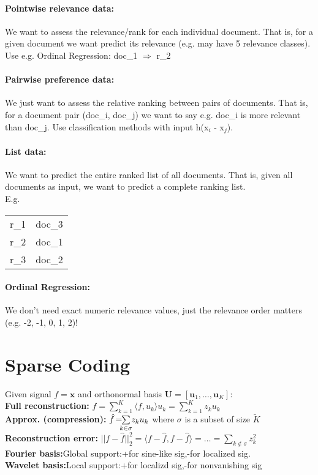 \documentclass[a4paper,11pt]{article}
\newcommand{\msection}[1]{\section{#1}\vspace{-0.5mm}}
\begin{document}
\begin{multicols}{2}
\paragraph{Pointwise relevance data:} We want to assess the relevance/rank for each individual document. That is, for a given document we want predict its relevance (e.g. may have 5 relevance classes). Use e.g. Ordinal Regression: doc\_1 $\Rightarrow$ r\_2

\paragraph{Pairwise preference data:} We just want to assess the relative ranking between pairs of documents. That is, for a document pair (doc\_i, doc\_j) we want to say e.g. doc\_i is more relevant than doc\_j. Use classification methods with input h(x$_i$ - x$_j$).

\paragraph{List data:} We want to predict the entire ranked list of all documents. That is, given all documents as input, we want to predict a complete ranking list. \\
E.g. 
\begin{tabular}{l|c}
\hline
r\_1  &  doc\_3  \\
r\_2 &  doc\_1   \\
r\_3 & doc\_2 \\
\end{tabular}

\paragraph{Ordinal Regression:} We don't need exact numeric relevance values, just the relevance order matters (e.g. -2, -1, 0, 1, 2)!

\msection{Sparse Coding}
Given signal $f = \mathbf{x}$ and orthonormal basis $\mathbf{U} = [ \mathbf{u}_1, \ldots, \mathbf{u}_K]$:\\
\textbf{Full reconstruction:} 
$f = \sum \limits_{k=1}^K \langle f, u_k\rangle u_k = \sum\limits_{k=1}^K z_k u_k$\\
\textbf{Approx. (compression):} \hspace{-0.05cm}$\hat{f} \hspace{-0.05cm} = \hspace{-0.2cm}\sum \limits_{k\in \sigma} \hspace{-0.1cm} z_k u_k$ where $\sigma$ is a subset of size $\tilde K$\\
\textbf{Reconstruction error:} $||f-\hat f||_2^2 = \langle f - \hat f, f - \hat f \rangle = \ldots = \sum \limits_{k \notin \sigma} z_k^2$\\
\textbf{Fourier basis:}Global support:+for sine-like sig,-for localized sig.\\
\textbf{Wavelet basis:}Local support:+for localizd sig,-for nonvanishing sig\\
\vspace{0.1cm}


\end{multicols}
\end{document}
